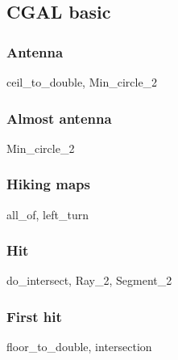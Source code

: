 \documentclass[10pt,a4paper,landscape,twocolumn,twoside]{article}
\begin{document}
	\newpage
	\subsection{CGAL basic}

		\subsubsection{Antenna}
		\begin{keywords}ceil\_to\_double, Min\_circle\_2\end{keywords}
		

		\subsubsection{Almost antenna}
		\begin{keywords}Min\_circle\_2\end{keywords}
		

		\subsubsection{Hiking maps}
		\begin{keywords}all\_of, left\_turn\end{keywords}
		

		\subsubsection{Hit}
		\begin{keywords}do\_intersect, Ray\_2, Segment\_2\end{keywords}
		

		\subsubsection{First hit}
		\begin{keywords}floor\_to\_double, intersection\end{keywords}
		
\end{document}
